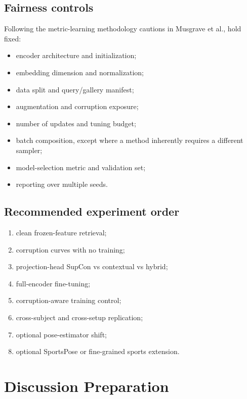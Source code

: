 \documentclass[11pt,oneside,openany]{book}
\theoremstyle{myplain}
\theoremstyle{definition}
\begin{document}
\section{Fairness controls}

Following the metric-learning methodology cautions in Musgrave et al., hold fixed:
\begin{itemize}[leftmargin=*,itemsep=2pt]
  \item encoder architecture and initialization;
  \item embedding dimension and normalization;
  \item data split and query/gallery manifest;
  \item augmentation and corruption exposure;
  \item number of updates and tuning budget;
  \item batch composition, except where a method inherently requires a different sampler;
  \item model-selection metric and validation set;
  \item reporting over multiple seeds.
\end{itemize}

\section{Recommended experiment order}

\begin{enumerate}[leftmargin=*,itemsep=4pt]
  \item clean frozen-feature retrieval;
  \item corruption curves with no training;
  \item projection-head SupCon vs contextual vs hybrid;
  \item full-encoder fine-tuning;
  \item corruption-aware training control;
  \item cross-subject and cross-setup replication;
  \item optional pose-estimator shift;
  \item optional SportsPose or fine-grained sports extension.
\end{enumerate}

\chapter{Discussion Preparation}
\label{chap:meeting}
\end{document}
